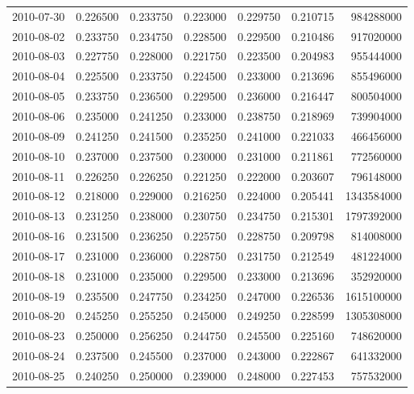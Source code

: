 \begin{tabular}{lrrrrrr}
2010-07-30 &    0.226500 &    0.233750 &    0.223000 &    0.229750 &    0.210715 &   984288000 \\
2010-08-02 &    0.233750 &    0.234750 &    0.228500 &    0.229500 &    0.210486 &   917020000 \\
2010-08-03 &    0.227750 &    0.228000 &    0.221750 &    0.223500 &    0.204983 &   955444000 \\
2010-08-04 &    0.225500 &    0.233750 &    0.224500 &    0.233000 &    0.213696 &   855496000 \\
2010-08-05 &    0.233750 &    0.236500 &    0.229500 &    0.236000 &    0.216447 &   800504000 \\
2010-08-06 &    0.235000 &    0.241250 &    0.233000 &    0.238750 &    0.218969 &   739904000 \\
2010-08-09 &    0.241250 &    0.241500 &    0.235250 &    0.241000 &    0.221033 &   466456000 \\
2010-08-10 &    0.237000 &    0.237500 &    0.230000 &    0.231000 &    0.211861 &   772560000 \\
2010-08-11 &    0.226250 &    0.226250 &    0.221250 &    0.222000 &    0.203607 &   796148000 \\
2010-08-12 &    0.218000 &    0.229000 &    0.216250 &    0.224000 &    0.205441 &  1343584000 \\
2010-08-13 &    0.231250 &    0.238000 &    0.230750 &    0.234750 &    0.215301 &  1797392000 \\
2010-08-16 &    0.231500 &    0.236250 &    0.225750 &    0.228750 &    0.209798 &   814008000 \\
2010-08-17 &    0.231000 &    0.236000 &    0.228750 &    0.231750 &    0.212549 &   481224000 \\
2010-08-18 &    0.231000 &    0.235000 &    0.229500 &    0.233000 &    0.213696 &   352920000 \\
2010-08-19 &    0.235500 &    0.247750 &    0.234250 &    0.247000 &    0.226536 &  1615100000 \\
2010-08-20 &    0.245250 &    0.255250 &    0.245000 &    0.249250 &    0.228599 &  1305308000 \\
2010-08-23 &    0.250000 &    0.256250 &    0.244750 &    0.245500 &    0.225160 &   748620000 \\
2010-08-24 &    0.237500 &    0.245500 &    0.237000 &    0.243000 &    0.222867 &   641332000 \\
2010-08-25 &    0.240250 &    0.250000 &    0.239000 &    0.248000 &    0.227453 &   757532000 \\

\end{tabular}
